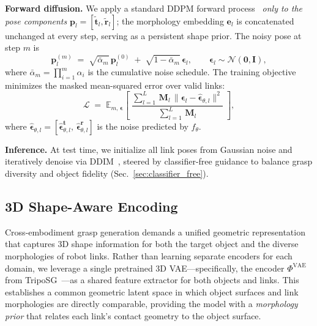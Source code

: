 \noindent\textbf{Forward diffusion.}
We apply a standard DDPM forward process~\cite{ho2020denoising} \emph{only to the pose components} $\mathbf{p}_l = [\tilde{\mathbf{t}}_l, \tilde{\mathbf{r}}_l]$; the morphology embedding $\mathbf{e}_l$ is concatenated unchanged at every step, serving as a persistent shape prior.
The noisy pose at step $m$ is
\begin{equation}
  \mathbf{p}_l^{(m)} \;=\; \sqrt{\bar{\alpha}_m}\,\mathbf{p}_l^{(0)} \;+\; \sqrt{1 - \bar{\alpha}_m}\,\boldsymbol{\epsilon}_l, \qquad \boldsymbol{\epsilon}_l \sim \mathcal{N}(\mathbf{0}, \mathbf{I}),
  \label{eq:forward_diffusion}
\end{equation}
where $\bar{\alpha}_m = \prod_{i=1}^{m} \alpha_i$ is the cumulative noise schedule.
The training objective minimizes the masked mean-squared error over valid links:
\begin{equation}
  \mathcal{L} \;=\; \mathbb{E}_{m,\,\boldsymbol{\epsilon}}\!\left[\;\frac{\sum_{l=1}^{L}\, \mathbf{M}_l \,\bigl\|\boldsymbol{\epsilon}_l - \hat{\boldsymbol{\epsilon}}_{\theta,l}\bigr\|^2}{\sum_{l=1}^{L}\, \mathbf{M}_l}\;\right],
  \label{eq:loss}
\end{equation}
where $\hat{\boldsymbol{\epsilon}}_{\theta,l} = [\hat{\boldsymbol{\epsilon}}_{\theta,l}^{\mathbf{t}},\, \hat{\boldsymbol{\epsilon}}_{\theta,l}^{\mathbf{r}}]$ is the noise predicted by $f_\theta$.

\noindent\textbf{Inference.}
At test time, we initialize all link poses from Gaussian noise and iteratively denoise via DDIM~\cite{song2020denoising}, steered by classifier-free guidance to balance grasp diversity and object fidelity (Sec.~\ref{sec:classifier_free}).

\subsection{3D Shape-Aware Encoding}
\label{sec:shape_aware_encoding}

Cross-embodiment grasp generation demands a unified geometric representation that captures 3D shape information for both the target object and the diverse morphologies of robot links.
Rather than learning separate encoders for each domain, we leverage a single pretrained 3D VAE---specifically, the encoder $\Phi^\text{VAE}$ from TripoSG~\cite{triposg}---as a shared feature extractor for both objects and links.
This establishes a common geometric latent space in which object surfaces and link morphologies are directly comparable, providing the model with a \emph{morphology prior} that relates each link's contact geometry to the object surface.

